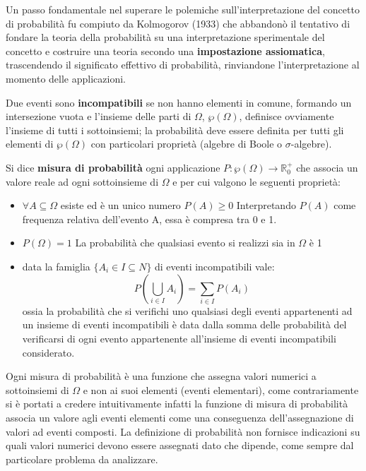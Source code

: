 \documentclass[a4paper,12pt, oneside]{book}
\newcommand{\numberset}{\mathbb}
\newcommand{\R}{\numberset{R}}
\begin{document}
Un passo fondamentale nel superare le polemiche sull'interpretazione del concetto di probabilità
fu compiuto da Kolmogorov (1933) che abbandonò il tentativo di fondare la teoria della probabilità su una 
interpretazione sperimentale del concetto e costruire una teoria secondo una \textbf{impostazione assiomatica},
trascendendo il significato effettivo di probabilità, rinviandone l'interpretazione al momento delle applicazioni.

Due eventi sono \textbf{incompatibili} se non hanno elementi in comune, formando un intersezione vuota
e l'insieme delle parti di $\Omega$, $\wp(\Omega)$, definisce ovviamente l'insieme di tutti i sottoinsiemi;
la probabilità deve essere definita per tutti gli elementi di $\wp(\Omega)$ con particolari proprietà (algebre di Boole o $\sigma$-algebre).

Si dice \textbf{misura di probabilità} ogni applicazione $P: \wp(\Omega) \to \R_0 ^ +$
che associa un valore reale ad ogni sottoinsieme di $\Omega$ e per cui valgono le seguenti proprietà:
\begin{itemize}
        \item $\forall A\subseteq \Omega$ esiste ed è un unico numero $P(A) \geq 0$
              Interpretando $P(A)$ come frequenza relativa dell'evento A, essa è compresa tra 0 e 1.

        \item $P(\Omega) = 1$ La probabilità che qualsiasi evento si realizzi sia in $\Omega$ è 1
        \item data la famiglia $\{A_i\in I\subseteq N\}$ di eventi incompatibili vale:
                \[ P\left(\bigcup_{i\in I}A_i\right) = \sum_{i\in I} P(A_i) \]
              ossia la probabilità che si verifichi uno qualsiasi degli eventi appartenenti ad un insieme
                di eventi incompatibili è data dalla somma delle probabilità del verificarsi di ogni evento 
                appartenente all'insieme di eventi incompatibili considerato.
\end{itemize}
Ogni misura di probabilità è una funzione che assegna valori numerici a sottoinsiemi di $\Omega$
e non ai suoi elementi (eventi elementari), come contrariamente si è portati a credere intuitivamente infatti
la funzione di misura di probabilità associa un valore agli eventi elementi 
come una conseguenza dell'assegnazione di valori ad eventi composti.\newline
La definizione di probabilità non fornisce indicazioni su quali valori numerici devono essere assegnati dato che dipende,
come sempre dal particolare problema da analizzare.
\end{document}
